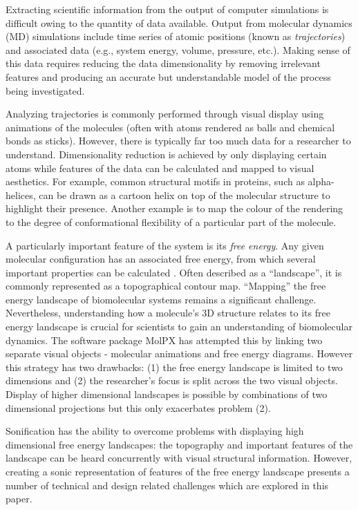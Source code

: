 \documentclass[a4paper,10pt,oneside]{article}
\begin{document}
\begin{sloppy}
Extracting scientific information from the output of computer simulations is difficult owing to the quantity of data available. Output from molecular dynamics (MD) simulations \cite{alder1959} include time series of atomic positions (known as \emph{trajectories}) and associated data (e.g., system energy, volume, pressure, etc.). Making sense of this data requires reducing the data dimensionality by removing irrelevant features and producing an accurate but understandable model of the process being investigated.  

Analyzing trajectories is commonly performed through visual display using animations of the molecules (often with atoms rendered as balls and chemical bonds as sticks). However, there is typically far too much data for a researcher to understand. Dimensionality reduction is achieved by only displaying certain atoms while features of the data can be calculated and mapped to visual aesthetics. For example, common structural motifs in proteins, such as alpha-helices, can be drawn as a cartoon helix on top of the molecular structure to highlight their presence.  Another example is to map the colour of the rendering to the degree of conformational flexibility of a particular part of the molecule. 

A particularly important feature of the system is its \emph{free energy}. Any given molecular configuration has an associated free energy, from which several important properties can be calculated \cite{Atkins}. Often described as a ``landscape'', it is commonly represented as a topographical contour map. ``Mapping'' the free energy landscape of biomolecular systems remains a significant challenge. Nevertheless, understanding how a molecule's 3D structure relates to its free energy landscape is crucial for scientists to gain an understanding of biomolecular dynamics. The software package MolPX \cite{molpx} has attempted this by linking two separate visual objects - molecular animations and free energy diagrams. However this strategy has two drawbacks: (1) the free energy landscape is limited to two dimensions and (2) the researcher's focus is split across the two visual objects. Display of higher dimensional landscapes is possible by combinations of two dimensional projections but this only exacerbates problem (2).   

Sonification has the ability to overcome problems with displaying high dimensional free energy landscapes: the topography and important features of the landscape can be heard concurrently with visual structural information. However, creating a sonic representation of features of the free energy landscape presents a number of technical and design related challenges which are explored in this paper.  


\end{sloppy}
\end{document}
